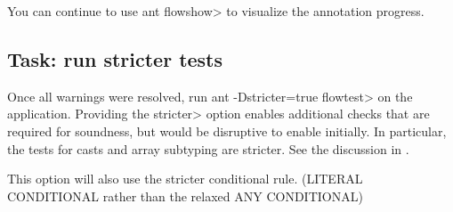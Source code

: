 You can continue to use \<ant flowshow> to visualize the annotation
progress.

\subsection{Task: run stricter tests}
Once all warnings were resolved, run \<ant -Dstricter=true flowtest> on
the application.
Providing the \<stricter> option enables additional checks that are
required for soundness, but would be disruptive to enable initially.
In particular, the tests for casts and array subtyping are stricter.
See the discussion in .

This option will also use the stricter conditional rule. (LITERAL
\flowsto{} CONDITIONAL rather than the relaxed ANY \flowsto{} CONDITIONAL)



